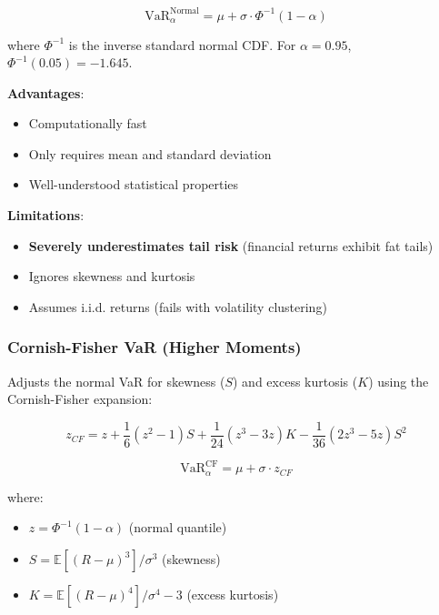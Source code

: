 \documentclass[12pt,a4paper]{article}
\begin{document}
\begin{equation}
\text{VaR}_\alpha^{\text{Normal}} = \mu + \sigma \cdot \Phi^{-1}(1-\alpha)
\end{equation}

where $\Phi^{-1}$ is the inverse standard normal CDF. For $\alpha = 0.95$, $\Phi^{-1}(0.05) = -1.645$.

\textbf{Advantages}:
\begin{itemize}
    \item Computationally fast
    \item Only requires mean and standard deviation
    \item Well-understood statistical properties
\end{itemize}

\textbf{Limitations}:
\begin{itemize}
    \item \textbf{Severely underestimates tail risk} (financial returns exhibit fat tails)
    \item Ignores skewness and kurtosis
    \item Assumes i.i.d. returns (fails with volatility clustering)
\end{itemize}

\subsubsection{Cornish-Fisher VaR (Higher Moments)}

Adjusts the normal VaR for skewness ($S$) and excess kurtosis ($K$) using the Cornish-Fisher expansion:

\begin{equation}
z_{CF} = z + \frac{1}{6}(z^2 - 1) S + \frac{1}{24}(z^3 - 3z) K - \frac{1}{36}(2z^3 - 5z) S^2
\end{equation}

\begin{equation}
\text{VaR}_\alpha^{\text{CF}} = \mu + \sigma \cdot z_{CF}
\end{equation}

where:
\begin{itemize}
    \item $z = \Phi^{-1}(1-\alpha)$ (normal quantile)
    \item $S = \mathbb{E}[(R-\mu)^3] / \sigma^3$ (skewness)
    \item $K = \mathbb{E}[(R-\mu)^4] / \sigma^4 - 3$ (excess kurtosis)
\end{itemize}
\end{document}
